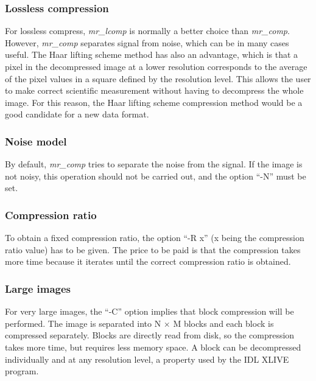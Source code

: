 \subsubsection*{Lossless compression}
For lossless compress, {\em mr\_lcomp} is normally a better choice than 
{\em mr\_comp}. However, {\em mr\_comp} separates signal from noise, which
can be in many cases useful. The Haar 
lifting scheme method has also an advantage,
which is that a pixel in the decompressed image at a lower resolution 
corresponds to the average of the pixel values in a square defined by
the resolution level. This allows the user to make correct scientific 
measurement without having to decompress the whole image. For this reason,
the Haar lifting scheme compression method would be a good candidate for 
a new data format. 

\subsubsection*{Noise model}
By default, {\em mr\_comp} tries to separate the noise from the signal. If
the image is not noisy, this operation should not be carried out, and the 
option ``-N'' must be set.

\subsubsection*{Compression ratio}
To obtain a fixed compression ratio, the option ``-R x'' (x being 
the compression
ratio value) has to be given. The price to be paid 
is that the compression takes
more time because it iterates until the correct compression ratio is obtained.

\subsubsection*{Large images}
For very large images, the ``-C'' option implies that block compression
will be performed. The image is separated into N $\times$ M blocks and 
each block is
compressed separately. Blocks are directly read from  disk, so the 
compression takes more time, but requires less memory space. A block can
be decompressed individually and at any resolution level, a 
 property used by the IDL XLIVE program.


\newpage
